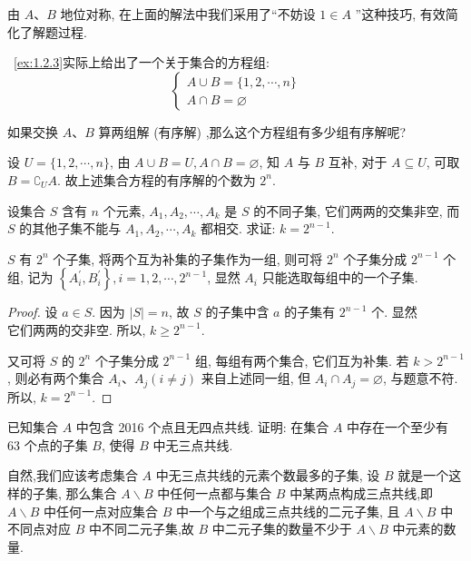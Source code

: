 \begin{note}
	由 $A 、 B$ 地位对称, 在上面的解法中我们采用了“不妨设 $1 \in A$ ”这种技巧, 有效简化了解题过程.
\end{note}

~\autoref{ex:1.2.3}实际上给出了一个关于集合的方程组:
$$
	\left\{\begin{array}{l}
		A \cup B=\{1,2, \cdots, n\} \\
		A \cap B=\varnothing
	\end{array}\right.
$$

如果交换 $A 、 B$ 算两组解 (有序解) ,那么这个方程组有多少组有序解呢?

设 $U=\{1,2, \cdots, n\}$, 由 $A \cup B=U, A \cap B=\varnothing$, 知 $A$ 与 $B$ 互补, 对于 $A \subseteq U$, 可取 $B=\complement_{U} A$. 故上述集合方程的有序解的个数为 $2^{n}$.

\begin{example}
	设集合 $S$ 含有 $n$ 个元素, $A_{1}, A_{2}, \cdots, A_{k}$ 是 $S$ 的不同子集, 它们两两的交集非空, 而 $S$ 的其他子集不能与 $A_{1}, A_{2}, \cdots, A_{k}$ 都相交. 求证: $k=2^{n-1}$.
\end{example}

\begin{analysis}
	$S$ 有 $2^{n}$ 个子集, 将两个互为补集的子集作为一组, 则可将 $2^{n}$ 个子集分成 $2^{n-1}$ 个组, 记为 $\left\{A_{i}^{\prime}, B_{i}^{\prime}\right\}, i=1,2, \cdots, 2^{n-1}$, 显然 $A_{i}$ 只能选取每组中的一个子集.
\end{analysis}

\begin{proof}
	设 $a \in S$. 因为 $|S|=n$, 故 $S$ 的子集中含 $a$ 的子集有 $2^{n-1}$ 个. 显然\\
	它们两两的交非空. 所以, $k \geqslant 2^{n-1}$.

	又可将 $S$ 的 $2^{n}$ 个子集分成 $2^{n-1}$ 组, 每组有两个集合, 它们互为补集. 若 $k>2^{n-1}$, 则必有两个集合 $A_{i} 、 A_{j}(i \neq j)$ 来自上述同一组, 但 $A_{i} \cap A_{j}=\varnothing$, 与题意不符. 所以, $k=2^{n-1}$.
\end{proof}

\begin{example}
	已知集合 $A$ 中包含 2016 个点且无四点共线. 证明: 在集合 $A$ 中存在一个至少有 63 个点的子集 $B$, 使得 $B$ 中无三点共线.
\end{example}

\begin{analysis}
	自然,我们应该考虑集合 $A$ 中无三点共线的元素个数最多的子集, 设 $B$ 就是一个这样的子集, 那么集合 $A \backslash B$ 中任何一点都与集合 $B$ 中某两点构成三点共线,即 $A \backslash B$ 中任何一点对应集合 $B$ 中一个与之组成三点共线的二元子集, 且 $A \backslash B$ 中不同点对应 $B$ 中不同二元子集,故 $B$ 中二元子集的数量不少于 $A \backslash B$ 中元素的数量.
\end{analysis}

